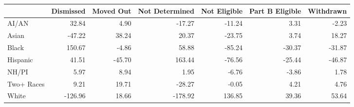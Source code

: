 \documentclass[border=1mm]{standalone}
\begin{document}
\begingroup\fontsize{12}{14}\selectfont

\begin{longtable}[t]{>{}l>{}r>{}r>{}r>{}r>{}rr}
\toprule
\textbf{} & \textbf{Dismissed} & \textbf{Moved Out} & \textbf{Not Determined} & \textbf{Not Eligible} & \textbf{Part B Eligible} & \textbf{Withdrawn}\\
\midrule
AI/AN & 32.84 & 4.90 & -17.27 & -11.24 & 3.31 & -2.23\\
Asian & -47.22 & 38.24 & 20.37 & -23.75 & 3.74 & 18.27\\
Black & 150.67 & -4.86 & 58.88 & -85.24 & -30.37 & -31.87\\
Hispanic & 41.51 & -45.70 & 163.44 & -76.56 & -25.44 & -46.87\\
NH/PI & 5.97 & 8.94 & 1.95 & -6.76 & -3.86 & 1.78\\
\addlinespace
Two+ Races & 9.21 & 19.71 & -28.27 & -0.05 & 4.21 & 4.76\\
White & -126.96 & 18.66 & -178.92 & 136.85 & 39.36 & 53.64\\
\bottomrule
\end{longtable}
\endgroup{}
\end{document}
